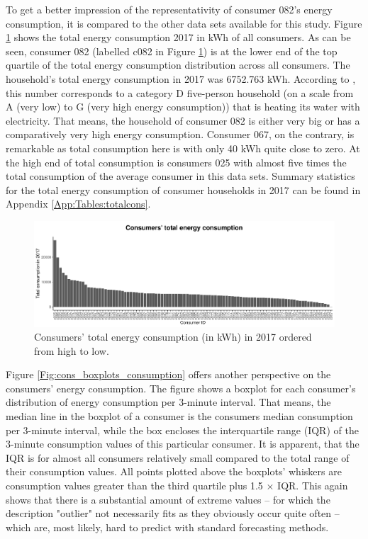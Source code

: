 To get a better impression of the representativity of consumer 082's energy consumption, it is compared to the other data sets available for this study. Figure \ref{Fig:cons_total_consumption} shows the total energy consumption 2017 in kWh of all consumers. As can be seen, consumer 082 (labelled c082 in Figure \ref{Fig:cons_total_consumption}) is at the lower end of the top quartile of the total energy consumption distribution across all consumers. The household's total energy consumption in 2017 was 6752.763 kWh. According to \citet{Stromspiegel:2017}, this number corresponds to a category D five-person household (on a scale from A (very low) to G (very high energy consumption)) that is heating its water with electricity. That means, the household of consumer 082 is either very big or has a comparatively very high energy consumption. Consumer 067, on the contrary, is remarkable as total consumption here is with only 40 kWh quite close to zero. At the high end of total consumption is consumers 025 with almost five times the total consumption of the average consumer in this data sets. Summary statistics for the total energy consumption of consumer households in 2017 can be found in Appendix \ref{App:Tables:totalcons}.

\begin{figure}[htbp]
 \centering
\includegraphics[width=\textwidth]{thesis/graphs/consumer_totalconsumption2.pdf}
\caption[Consumers' total energy consumption (in kWh) in 2017 ordered from high to low]{Consumers' total energy consumption (in kWh) in 2017 ordered from high to low. \quantnet}
\label{Fig:cons_total_consumption}
\end{figure}

Figure \ref{Fig:cons_boxplots_consumption} offers another perspective on the consumers' energy consumption. The figure shows a boxplot for each consumer's distribution of energy consumption per 3-minute interval. That means, the median line in the boxplot of a consumer is the consumers median consumption per 3-minute interval, while the box encloses the interquartile range (IQR) of the 3-minute consumption values of this particular consumer. It is apparent, that the IQR is for almost all consumers relatively small compared to the total range of their consumption values. All points plotted above the boxplots' whiskers are consumption values greater than the third quartile plus 1.5 $\times$ IQR. This again shows that there is a substantial amount of extreme values -- for which the description "outlier" not necessarily fits as they obviously occur quite often -- which are, most likely, hard to predict with standard forecasting methods.

